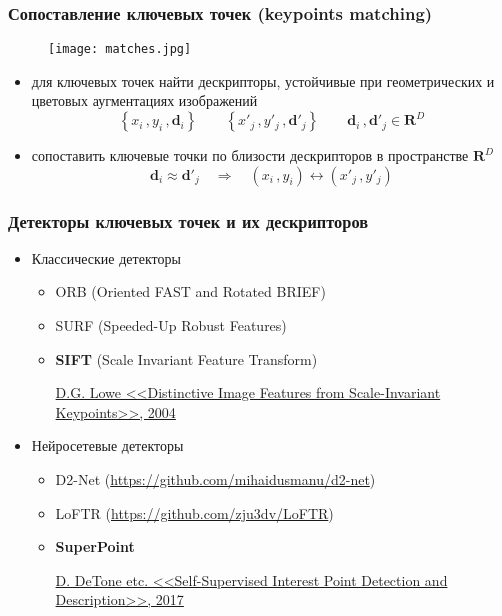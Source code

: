 \documentclass[12pt, usepdftitle=false, aspectratio=1610]{beamer}
\begin{document}
\begin{frame}
\frametitle{Сопоставление ключевых точек (keypoints matching)}
\begin{figure}
    \centering
    \texttt{[image: matches.jpg]}
\end{figure}
\begin{itemize}
    \item для ключевых точек найти дескрипторы, устойчивые при геометрических и цветовых аугментациях изображений
    $$
        \left\{x_i\,,y_i\,,\mathbf{d}_i\right\}\qquad
        \left\{x'_j\,,y'_j\,,\mathbf{d}'_j\right\}\qquad
        \mathbf{d}_i\,,\mathbf{d}'_j\in\mathbf{R}^D
    $$
    \item сопоставить ключевые точки по близости дескрипторов в пространстве $\mathbf{R}^D$
    $$
        \mathbf{d}_i\approx\mathbf{d}'_j
        \quad\Rightarrow\quad
        (x_i\,,y_i)\leftrightarrow (x'_j\,,y'_j)
    $$
\end{itemize}
\end{frame}

\begin{frame}
\frametitle{Детекторы ключевых точек и их дескрипторов}
\begin{itemize}
    \item Классические детекторы
    \begin{itemize}
        \item ORB (Oriented FAST and Rotated BRIEF)
        \item SURF (Speeded-Up Robust Features)
        \item \textbf{SIFT} (Scale Invariant Feature Transform)
        
        \href{https://www.cs.ubc.ca/~lowe/papers/ijcv04.pdf}
        {D.G. Lowe <<Distinctive Image Features from Scale-Invariant Keypoints>>, 2004}
    \end{itemize}
    \item Нейросетевые детекторы
    \begin{itemize}
        \item D2-Net (\url{https://github.com/mihaidusmanu/d2-net})
        \item LoFTR (\url{https://github.com/zju3dv/LoFTR})
        \item \textbf{SuperPoint} 
        
        \href{https://arxiv.org/abs/1712.07629}
        {D. DeTone etc. <<Self-Supervised Interest Point Detection and Description>>, 2017}
    \end{itemize}
\end{itemize}

\end{frame}
\end{document}
